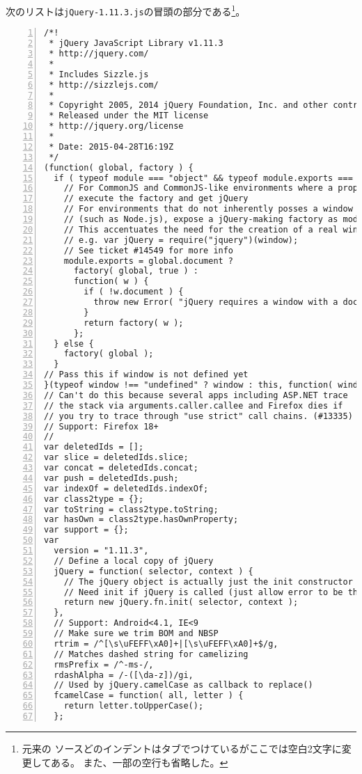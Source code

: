 \iffalse
jQueryのソースファイルには\texttt{jQuery-<Version No>.js}と
\texttt{jQuery-<Version No>.min.js}の2種類が存在する。
\texttt{jQuery-<Version No>.min.js}は\texttt{jQuery-<Version No>.js}から
コメントや、空白を取り除き、変数名を短いものに置き換えるという操作を行っ
て、ファイルサイズを小さくしたものである。
\fi
次のリストは\texttt{jQuery-1.11.3.js}の冒頭の部分である\footnote{元来の
ソースどのインデントはタブでつけているがここでは空白2文字に変更してある。
また、一部の空行も省略した。}。
\begin{Verbatim}[numbers=left,fontsize=\small]
/*!
 * jQuery JavaScript Library v1.11.3
 * http://jquery.com/
 *
 * Includes Sizzle.js
 * http://sizzlejs.com/
 *
 * Copyright 2005, 2014 jQuery Foundation, Inc. and other contributors
 * Released under the MIT license
 * http://jquery.org/license
 *
 * Date: 2015-04-28T16:19Z
 */
(function( global, factory ) {
  if ( typeof module === "object" && typeof module.exports === "object" ) {
    // For CommonJS and CommonJS-like environments where a proper window is present,
    // execute the factory and get jQuery
    // For environments that do not inherently posses a window with a document
    // (such as Node.js), expose a jQuery-making factory as module.exports
    // This accentuates the need for the creation of a real window
    // e.g. var jQuery = require("jquery")(window);
    // See ticket #14549 for more info
    module.exports = global.document ?
      factory( global, true ) :
      function( w ) {
        if ( !w.document ) {
          throw new Error( "jQuery requires a window with a document" );
        }
        return factory( w );
      };
  } else {
    factory( global );
  }
// Pass this if window is not defined yet
}(typeof window !== "undefined" ? window : this, function( window, noGlobal ) {
// Can't do this because several apps including ASP.NET trace
// the stack via arguments.caller.callee and Firefox dies if
// you try to trace through "use strict" call chains. (#13335)
// Support: Firefox 18+
//
var deletedIds = [];
var slice = deletedIds.slice;
var concat = deletedIds.concat;
var push = deletedIds.push;
var indexOf = deletedIds.indexOf;
var class2type = {};
var toString = class2type.toString;
var hasOwn = class2type.hasOwnProperty;
var support = {};
var
  version = "1.11.3",
  // Define a local copy of jQuery
  jQuery = function( selector, context ) {
    // The jQuery object is actually just the init constructor 'enhanced'
    // Need init if jQuery is called (just allow error to be thrown if not included)
    return new jQuery.fn.init( selector, context );
  },
  // Support: Android<4.1, IE<9
  // Make sure we trim BOM and NBSP
  rtrim = /^[\s\uFEFF\xA0]+|[\s\uFEFF\xA0]+$/g,
  // Matches dashed string for camelizing
  rmsPrefix = /^-ms-/,
  rdashAlpha = /-([\da-z])/gi,
  // Used by jQuery.camelCase as callback to replace()
  fcamelCase = function( all, letter ) {
    return letter.toUpperCase();
  };
\end{Verbatim}

